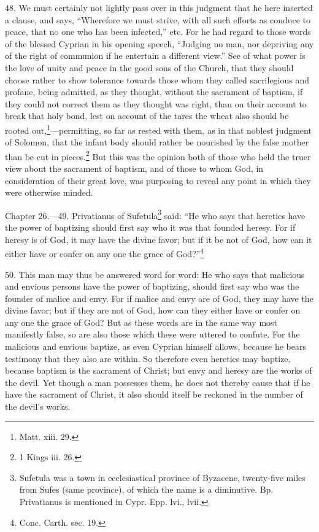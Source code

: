 48. We must certainly not lightly pass over in this judgment that he here inserted a clause, and says, ``Wherefore we must strive, with all such efforts as conduce to peace, that no one who has been infected,'' etc. For he had regard to those words of the blessed Cyprian in his opening speech, ``Judging no man, nor depriving any of the right of communion if he entertain a different view.'' See of what power is the love of unity and peace in the good sons of the Church, that they should choose rather to show tolerance towards those whom they called sacrilegious and profane, being admitted, as they thought, without the sacrament of baptism, if they could not correct them as they thought was right, than on their account to break that holy bond, lest on account of the tares the wheat also should be rooted out,\footnote{\par  Matt. xiii. 29.}—permitting, so far as rested with them, as in that noblest judgment of Solomon, that the infant body should rather be nourished by the false mother than be cut in pieces.\footnote{\par  1 Kings iii. 26.} But this was the opinion both of those who held the truer view about the sacrament of baptism, and of those to whom God, in consideration of their great love, was purposing to reveal any point in which they were otherwise minded.


Chapter 26.—49. Privatianus of Sufetula\footnote{\par  Sufetula was a town in ecclesiastical province of Byzacene, twenty-five miles from Sufes (same province), of which the name is a diminutive. Bp. Privatianus is mentioned in Cypr. Epp. lvi., lvii.} said: ``He who says that heretics have the power of baptizing should first say who it was that founded heresy. For if heresy is of God, it may have the divine favor; but if it be not of God, how can it either have or confer on any one the grace of God?''\footnote{\par  Conc. Carth. sec. 19.}

50. This man may thus be answered word for word: He who says that malicious and envious persons have the power of baptizing, should first say who was the founder of malice and envy. For if malice and envy are of God, they may have the divine favor; but if they are not of God, how can they either have or confer on any one the grace of God? But as these words are in the same way most manifestly false, so are also those which these were uttered to confute. For the malicious and envious baptize, as even Cyprian himself allows, because he bears testimony that they also are within. So therefore even heretics may baptize, because baptism is the sacrament of Christ; but envy and heresy are the works of the devil. Yet though a man possesses them, he does not thereby cause that if he have the sacrament of Christ, it also should itself be reckoned in the number of the devil’s works.

